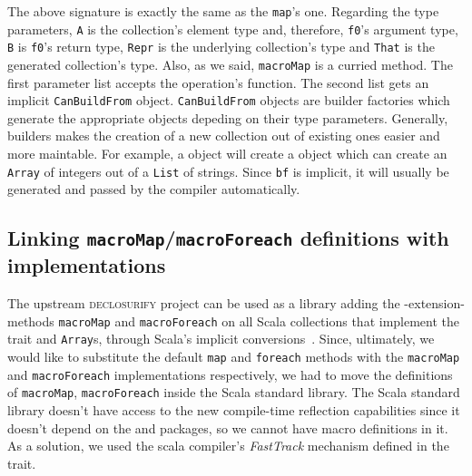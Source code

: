 The above signature is exactly the same as the \texttt{map}'s one. Regarding the
type parameters, \texttt{A} is the collection's element type and, therefore, \texttt{f0}'s
argument type, \texttt{B} is \texttt{f0}'s return type, \texttt{Repr} is the underlying collection's type
and \texttt{That} is the generated collection's type. Also, as we said, \texttt{macroMap} is a
curried method. The first parameter list accepts the operation's function. The
second list gets an implicit \texttt{CanBuildFrom} object. \texttt{CanBuildFrom} objects are
builder factories which generate the appropriate
 objects depeding on their type parameters.
Generally, builders makes the creation of a new collection out of existing ones
easier and more maintable. For example, a  object will create a  object which can
create an \texttt{Array} of integers out of a \texttt{List} of strings. Since \texttt{bf} is implicit, it
will usually be generated and passed by the compiler automatically.


\subsection{Linking \texttt{macroMap}/\texttt{macroForeach} definitions with implementations}
\label{ft_decl_std_lib}

The upstream \textsc{declosurify} project can be used as a library adding the -extension-
methods \texttt{macroMap} and \texttt{macroForeach} on all Scala collections that implement the
 trait and \texttt{Array}s, through Scala's implicit
conversions~\cite{oliveira_type_2010}. Since, ultimately, we would like to
substitute the default \texttt{map} and \texttt{foreach} methods with the \texttt{macroMap} and
\texttt{macroForeach} implementations respectively, we had to move the definitions
of \texttt{macroMap}, \texttt{macroForeach} inside the Scala standard library. The Scala standard
library doesn't have access to the new compile-time reflection capabilities
since it doesn't depend on the  and  packages, so we
cannot have macro definitions in it. As a solution, we used the scala compiler's
\emph{FastTrack} mechanism defined in the  trait.


